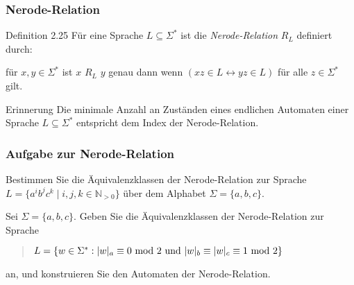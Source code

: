 \documentclass{beamer}
\begin{document}
\begin{frame}
 \frametitle{Nerode-Relation}
 \begin{block}{Definition 2.25}
 Für eine Sprache \(L \subseteq \Sigma^*\) ist die \emph{Nerode-Relation} \(R_L\) definiert durch:
  
  für \(x, y \in \Sigma^*\) ist $x$ $R_L$ $y$ genau dann wenn \((xz \in L \leftrightarrow yz \in L)\) für alle $z \in \Sigma^*$ gilt.
 \end{block}
  \begin{block}{Erinnerung}
   Die minimale Anzahl an Zuständen eines endlichen Automaten einer Sprache $L \subseteq \Sigma^*$ entspricht dem Index der Nerode-Relation.
  \end{block}
\end{frame}
\begin{frame}
\frametitle{Aufgabe zur Nerode-Relation}
Bestimmen Sie die Äquivalenzklassen der Nerode-Relation zur Sprache $L=\{a^ib^jc^k \mid i,j,k \in \mathbb{N}_{>0} \}$ über dem Alphabet $\Sigma=\{a,b,c\}$.
\end{frame}
\begin{frame}
 Sei $\Sigma = \{a,b,c\}.$ Geben Sie die Äquivalenzklassen der Nerode-Relation
zur Sprache

\begin{quote}
  $L = \{w \in \Sigma^*: |w|_a \equiv 0 \textup{ mod } 2 \textup{ und } |w|_b
  \equiv |w|_c \equiv 1 \textup{ mod } 2\}$
\end{quote}

an, und konstruieren Sie den Automaten der Nerode-Relation.
\end{frame}
\end{document}
